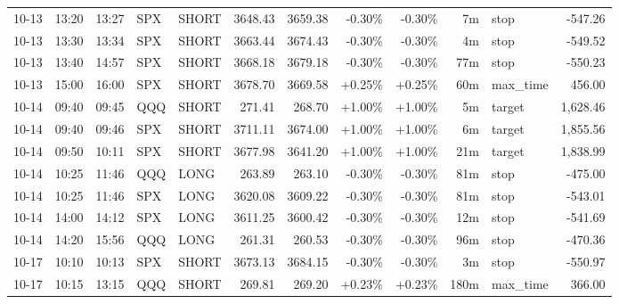 \documentclass[11pt,a4paper]{article}
\begin{document}
\begin{center}
\begin{longtable}{>{\color{txtmain}}l l l l l r r r r r >{\color{txtmain}}l r}
10-13 & 13:20 & 13:27 & SPX & SHORT & 3648.43 & 3659.38 & \textcolor{lossred}{-0.30\%} & \textcolor{lossred}{-0.30\%} & 7m & stop & \textcolor{lossred}{-547.26} \\
10-13 & 13:30 & 13:34 & SPX & SHORT & 3663.44 & 3674.43 & \textcolor{lossred}{-0.30\%} & \textcolor{lossred}{-0.30\%} & 4m & stop & \textcolor{lossred}{-549.52} \\
10-13 & 13:40 & 14:57 & SPX & SHORT & 3668.18 & 3679.18 & \textcolor{lossred}{-0.30\%} & \textcolor{lossred}{-0.30\%} & 77m & stop & \textcolor{lossred}{-550.23} \\
10-13 & 15:00 & 16:00 & SPX & SHORT & 3678.70 & 3669.58 & \textcolor{wingreen}{+0.25\%} & \textcolor{wingreen}{+0.25\%} & 60m & max\_time & \textcolor{wingreen}{456.00} \\
10-14 & 09:40 & 09:45 & QQQ & SHORT & 271.41 & 268.70 & \textcolor{wingreen}{+1.00\%} & \textcolor{wingreen}{+1.00\%} & 5m & target & \textcolor{wingreen}{1,628.46} \\
10-14 & 09:40 & 09:46 & SPX & SHORT & 3711.11 & 3674.00 & \textcolor{wingreen}{+1.00\%} & \textcolor{wingreen}{+1.00\%} & 6m & target & \textcolor{wingreen}{1,855.56} \\
10-14 & 09:50 & 10:11 & SPX & SHORT & 3677.98 & 3641.20 & \textcolor{wingreen}{+1.00\%} & \textcolor{wingreen}{+1.00\%} & 21m & target & \textcolor{wingreen}{1,838.99} \\
10-14 & 10:25 & 11:46 & QQQ & LONG & 263.89 & 263.10 & \textcolor{lossred}{-0.30\%} & \textcolor{lossred}{-0.30\%} & 81m & stop & \textcolor{lossred}{-475.00} \\
10-14 & 10:25 & 11:46 & SPX & LONG & 3620.08 & 3609.22 & \textcolor{lossred}{-0.30\%} & \textcolor{lossred}{-0.30\%} & 81m & stop & \textcolor{lossred}{-543.01} \\
10-14 & 14:00 & 14:12 & SPX & LONG & 3611.25 & 3600.42 & \textcolor{lossred}{-0.30\%} & \textcolor{lossred}{-0.30\%} & 12m & stop & \textcolor{lossred}{-541.69} \\
10-14 & 14:20 & 15:56 & QQQ & LONG & 261.31 & 260.53 & \textcolor{lossred}{-0.30\%} & \textcolor{lossred}{-0.30\%} & 96m & stop & \textcolor{lossred}{-470.36} \\
10-17 & 10:10 & 10:13 & SPX & SHORT & 3673.13 & 3684.15 & \textcolor{lossred}{-0.30\%} & \textcolor{lossred}{-0.30\%} & 3m & stop & \textcolor{lossred}{-550.97} \\
10-17 & 10:15 & 13:15 & QQQ & SHORT & 269.81 & 269.20 & \textcolor{wingreen}{+0.23\%} & \textcolor{wingreen}{+0.23\%} & 180m & max\_time & \textcolor{wingreen}{366.00} \\

\end{longtable}
\end{center}
\end{document}
